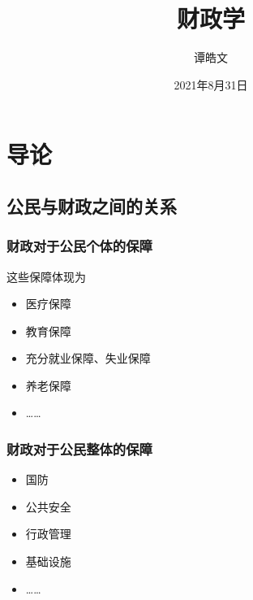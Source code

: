\documentclass[
]{book}
\title{财政学}
\author{谭皓文}
\date{2021年8月31日}
\providecommand{\tightlist}{%
  \setlength{\itemsep}{0pt}\setlength{\parskip}{0pt}}
\theoremstyle{definition}
\theoremstyle{definition}
\theoremstyle{definition}
\theoremstyle{definition}
\theoremstyle{remark}
\begin{document}
\maketitle

{
\setcounter{tocdepth}{1}
\tableofcontents
}
\hypertarget{ux5bfcux8bba}{%
\chapter{导论}\label{ux5bfcux8bba}}

\hypertarget{ux516cux6c11ux4e0eux8d22ux653fux4e4bux95f4ux7684ux5173ux7cfb}{%
\section{公民与财政之间的关系}\label{ux516cux6c11ux4e0eux8d22ux653fux4e4bux95f4ux7684ux5173ux7cfb}}

\hypertarget{ux8d22ux653fux5bf9ux4e8eux516cux6c11ux4e2aux4f53ux7684ux4fddux969c}{%
\subsection{财政对于公民个体的保障}\label{ux8d22ux653fux5bf9ux4e8eux516cux6c11ux4e2aux4f53ux7684ux4fddux969c}}

这些保障体现为

\begin{itemize}
\tightlist
\item
  医疗保障
\item
  教育保障
\item
  充分就业保障、失业保障
\item
  养老保障
\item
  \ldots\ldots{}
\end{itemize}

\hypertarget{ux8d22ux653fux5bf9ux4e8eux516cux6c11ux6574ux4f53ux7684ux4fddux969c}{%
\subsection{财政对于公民整体的保障}\label{ux8d22ux653fux5bf9ux4e8eux516cux6c11ux6574ux4f53ux7684ux4fddux969c}}

\begin{itemize}
\tightlist
\item
  国防
\item
  公共安全
\item
  行政管理
\item
  基础设施
\item
  \ldots\ldots{}
\end{itemize}
\end{document}
